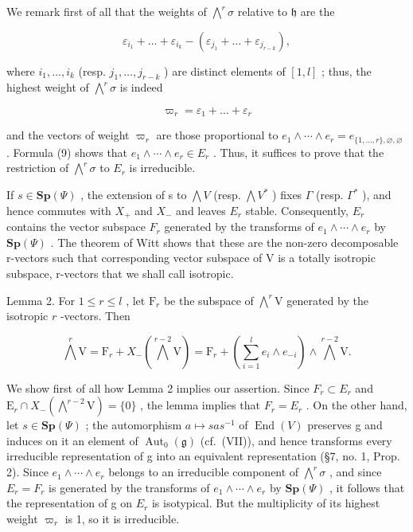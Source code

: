 We remark first of all that the weights of \(\bigwedge^{r}\sigma\) relative to \(\mathfrak{h}\) are the

\[
\varepsilon_ {i _ {1}} + \dots + \varepsilon_ {i _ {k}} - (\varepsilon_ {j _ {1}} + \dots + \varepsilon_ {j _ {r - k}}),
\]

where \(i_1, \ldots, i_k\) (resp. \(j_1, \ldots, j_{r-k}\) ) are distinct elements of \([1, l]\) ; thus, the highest weight of \(\bigwedge^r \sigma\) is indeed

\[
\varpi_ {r} = \varepsilon_ {1} + \dots + \varepsilon_ {r}
\]

and the vectors of weight \(\varpi_{r}\) are those proportional to \(e_{1} \wedge \cdots \wedge e_{r} = e_{\{1,\ldots,r\},\varnothing,\varnothing}\) . Formula (9) shows that \(e_{1} \wedge \cdots \wedge e_{r} \in E_{r}\) . Thus, it suffices to prove that the restriction of \(\bigwedge^{r}\sigma\) to \(E_{r}\) is irreducible.

If \(s \in \mathbf{Sp}(\varPsi)\) , the extension of s to \(\bigwedge V\) (resp. \(\bigwedge V^{*}\) ) fixes \(\varGamma\) (resp. \(\varGamma^{*}\) ), and hence commutes with \(X_{+}\) and \(X_{-}\) and leaves \(E_{r}\) stable. Consequently, \(E_{r}\) contains the vector subspace \(F_{r}\) generated by the transforms of \(e_{1} \wedge \cdots \wedge e_{r}\) by \(\mathbf{Sp}(\varPsi)\) . The theorem of Witt shows that these are the non-zero decomposable r-vectors such that corresponding vector subspace of V is a totally isotropic subspace, r-vectors that we shall call isotropic.

Lemma 2. For \(1 \leq r \leq l\) , let \(\mathrm{F}_r\) be the subspace of \(\bigwedge^r\mathrm{V}\) generated by the isotropic \(r\) -vectors. Then

\[
\bigwedge^ {r} \mathrm{V} = \mathrm{F} _ {r} + X _ {-} (\bigwedge^ {r - 2} \mathrm{V}) = \mathrm{F} _ {r} + \left(\sum_ {i = 1} ^ {l} e _ {i} \wedge e _ {- i}\right) \wedge \bigwedge^ {r - 2} \mathrm{V}.
\]

We show first of all how Lemma 2 implies our assertion. Since \(F_{r} \subset E_{r}\) and \(\mathrm{E}_{r} \cap X_{-}(\bigwedge^{r-2}\mathrm{V}) = \{0\}\) , the lemma implies that \(F_{r} = E_{r}\) . On the other hand, let \(s \in \mathbf{Sp}(\varPsi)\) ; the automorphism \(a \mapsto sas^{-1}\) of \(\operatorname{End}(V)\) preserves g and induces on it an element of \(\operatorname{Aut}_{0}(\mathfrak{g})\) (cf.~(VII)), and hence transforms every irreducible representation of g into an equivalent representation (§7, no. 1, Prop. 2). Since \(e_{1} \wedge \cdots \wedge e_{r}\) belongs to an irreducible component of \(\bigwedge^{r}\sigma\) , and since \(E_{r} = F_{r}\) is generated by the transforms of \(e_{1} \wedge \cdots \wedge e_{r}\) by \(\mathbf{Sp}(\varPsi)\) , it follows that the representation of g on \(E_{r}\) is isotypical. But the multiplicity of its highest weight \(\varpi_{r}\) is 1, so it is irreducible.

